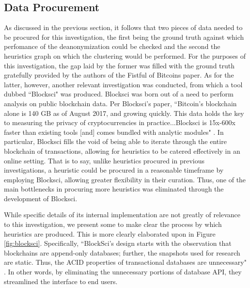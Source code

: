 \documentclass{article}
\begin{document}
\subsection{Data Procurement}
As discussed in the previous section, it follows that two pieces of data needed to be procured for this investigation, the first being the ground truth against which perfomance of the deanonymization could be checked and the second the heuristics graph on which the clustering would be performed. For the purposes of this investigation, the gap laid by the former was filled with the ground truth gratefully provided by the authors of the Fistful of Bitcoins paper. As for the latter, however, another relevant investigation was conducted, from which a tool dubbed ``Blocksci" was produced. Blocksci was born out of a need to perform analysis on public blockchain data. Per Blocksci's paper, ``Bitcoin's blockchain alone is 140 GB as of August 2017, and growing quickly. This data holds the key to measuring the privacy of cryptocurrencies in practice...Blocksci is 15x-600x faster than existing tools [and] comes bundled with analytic modules" \cite{blocksci}. In particular, Blocksci fills the void of being able to iterate through the entire blockchain of transactions, allowing for heuristics to be catered effectively in an online setting. That is to say, unlike heuristics procured in previous investigations, a heuristic could be procured in a reasonable timeframe by employing Blocksci, allowing greater flexibility in their curation. Thus, one of the main bottlenecks in procuring more heuristics was eliminated through the development of Blocksci.

While specific details of its internal implementation are not greatly of relevance to this investigation, we present some to make clear the process by which heuristics are produced. This is more clearly elaborated upon in Figure \ref{fig:blocksci}. Specifically, ``BlockSci's design starts with the observation that blockchains are append-only databases; further, the snapshots used for research are static. Thus, the ACID properties of transactional databases are unnecessary" \cite{blocksci}. In other words, by eliminating the unnecessary portions of database API, they streamlined the interface to end users. 
\end{document}
